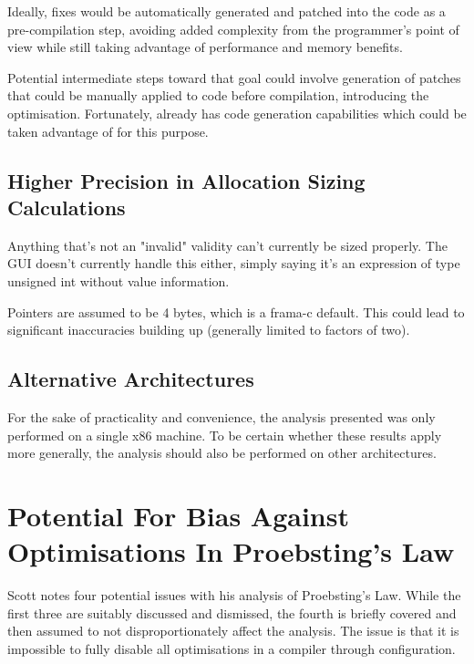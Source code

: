 Ideally, fixes would be automatically generated and patched into the code as a pre-compilation step, avoiding added complexity from the programmer's point of view while still taking advantage of performance and memory benefits.

Potential intermediate steps toward that goal could involve generation of patches that could be manually applied to code before compilation, introducing the optimisation. Fortunately,  already has code generation capabilities which could be taken advantage of for this purpose.

\subsection{Higher Precision in Allocation Sizing Calculations}


Anything that's not an "invalid" validity can't currently be sized properly. The GUI doesn't currently handle this either, simply saying it's an expression of type unsigned int without value information.

Pointers are assumed to be 4 bytes, which is a frama-c default. This could lead to significant inaccuracies building up (generally limited to factors of two).

\subsection{Alternative Architectures}

For the sake of practicality and convenience, the analysis presented was only performed on a single x86 machine. To be certain whether these results apply more generally, the analysis should also be performed on other architectures.

\section{Potential For Bias Against Optimisations In Proebsting's Law}

Scott notes four potential issues with his analysis of Proebsting's Law. While the first three are suitably discussed and dismissed, the fourth is briefly covered and then assumed to not disproportionately affect the analysis. The issue is that it is impossible to fully disable all optimisations in a compiler through configuration.

